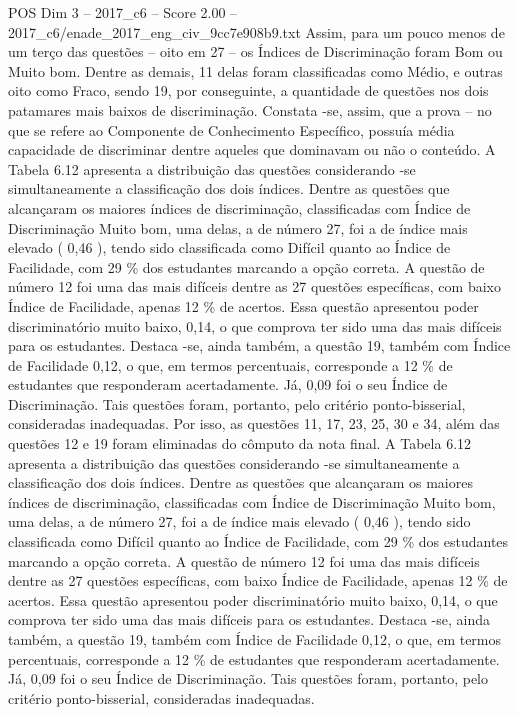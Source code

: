 \begin{textsample}{POS Dim 3 – 2017\_c6 – Score 2.00 – 2017\_c6/enade\_2017\_eng\_civ\_9cc7e908b9.txt}
Assim, para um pouco menos de um terço das questões – oito em 27 – os Índices de Discriminação foram Bom ou Muito bom.
Dentre as demais, 11 delas foram classificadas como Médio, e outras oito como Fraco, sendo 19, por conseguinte, a quantidade de questões nos dois patamares mais baixos de discriminação.
Constata -se, assim, que a prova – no que se refere ao Componente de Conhecimento Específico, possuía média capacidade de discriminar dentre aqueles que dominavam ou não o conteúdo.
A Tabela 6.12 apresenta a distribuição das questões considerando -se simultaneamente a classificação dos dois índices.
Dentre as questões que alcançaram os maiores índices de discriminação, classificadas com Índice de Discriminação Muito bom, uma delas, a de número 27, foi a de índice mais elevado ( 0,46 ), tendo sido classificada como Difícil quanto ao Índice de Facilidade, com 29 \% dos estudantes marcando a opção correta.
A questão de número 12 foi uma das mais difíceis dentre as 27 questões específicas, com baixo Índice de Facilidade, apenas 12 \% de acertos.
Essa questão apresentou poder discriminatório muito baixo, 0,14, o que comprova ter sido uma das mais difíceis para os estudantes.
Destaca -se, ainda também, a questão 19, também com Índice de Facilidade 0,12, o que, em termos percentuais, corresponde a 12 \% de estudantes que responderam acertadamente.
Já, 0,09 foi o seu Índice de Discriminação.
Tais questões foram, portanto, pelo critério ponto-bisserial, consideradas inadequadas.
Por isso, as questões 11, 17, 23, 25, 30 e 34, além das questões 12 e 19 foram eliminadas do cômputo da nota final.
A Tabela 6.12 apresenta a distribuição das questões considerando -se simultaneamente a classificação dos dois índices.
Dentre as questões que alcançaram os maiores índices de discriminação, classificadas com Índice de Discriminação Muito bom, uma delas, a de número 27, foi a de índice mais elevado ( 0,46 ), tendo sido classificada como Difícil quanto ao Índice de Facilidade, com 29 \% dos estudantes marcando a opção correta.
A questão de número 12 foi uma das mais difíceis dentre as 27 questões específicas, com baixo Índice de Facilidade, apenas 12 \% de acertos.
Essa questão apresentou poder discriminatório muito baixo, 0,14, o que comprova ter sido uma das mais difíceis para os estudantes.
Destaca -se, ainda também, a questão 19, também com Índice de Facilidade 0,12, o que, em termos percentuais, corresponde a 12 \% de estudantes que responderam acertadamente.
Já, 0,09 foi o seu Índice de Discriminação.
Tais questões foram, portanto, pelo critério ponto-bisserial, consideradas inadequadas.

\end{textsample}
